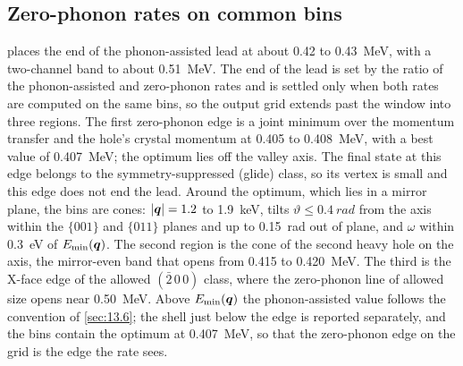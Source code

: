 \subsection{Zero-phonon rates on common bins}

 places the end of the phonon-assisted lead at about 0.42 to \SI{0.43}{MeV}, with a two-channel band to about \SI{0.51}{MeV}. The end of the lead is set by the ratio of the phonon-assisted and zero-phonon rates and is settled only when both rates are computed on the same bins, so the output grid extends past the window into three regions. The first zero-phonon edge is a joint minimum over the momentum transfer and the hole's crystal momentum at 0.405 to \SI{0.408}{MeV}, with a best value of \SI{0.407}{MeV}; the optimum lies off the valley axis. The final state at this edge belongs to the symmetry-suppressed (glide) class, so its vertex is small and this edge does not end the lead. Around the optimum, which lies in a mirror plane, the bins are cones: $|\bm{q}| = 1.2$ to \SI{1.9}{keV}, tilts $\vartheta \le \SI{0.4}{rad}$ from the axis within the $\{001\}$ and $\{011\}$ planes and up to \SI{0.15}{rad} out of plane, and $\omega$ within \SI{0.3}{eV} of $E_{\mathrm{min}}(\bm{q})$. The second region is the cone of the second heavy hole on the axis, the mirror-even band that opens from 0.415 to \SI{0.420}{MeV}. The third is the X-face edge of the allowed $(\bar2\,0\,0)$ class, where the zero-phonon line of allowed size opens near \SI{0.50}{MeV}. Above $E_{\mathrm{min}}(\bm{q})$ the phonon-assisted value follows the convention of \cref{sec:13.6}; the shell just below the edge is reported separately, and the bins contain the optimum at \SI{0.407}{MeV}, so that the zero-phonon edge on the grid is the edge the rate sees.

